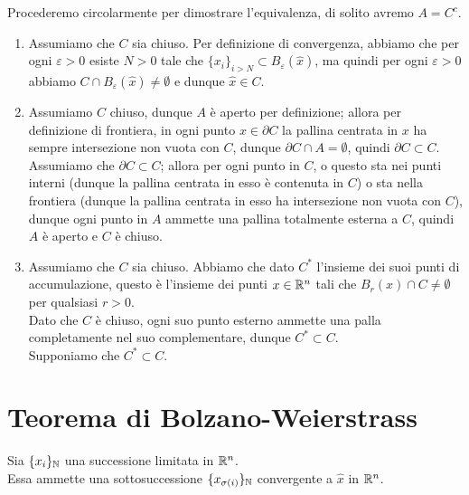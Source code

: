 \documentclass[openany]{book}
\begin{document}
    Procederemo circolarmente per dimostrare l'equivalenza, di solito avremo $A = C^c$.\begin{enumerate}
        \item Assumiamo che $C$ sia chiuso. Per definizione di convergenza, abbiamo che per ogni $\varepsilon > 0$ esiste $N>0$ tale che $\{x_i\}_{i>N} \subset B_\varepsilon(\hat{x})$, ma quindi per ogni $\varepsilon > 0$ abbiamo $C \cap B_\varepsilon(\hat{x})\neq \emptyset$ e dunque $\hat{x} \in C$.
        \item Assumiamo $C$ chiuso, dunque $A$ è aperto per definizione; allora per definizione di frontiera, in ogni punto $x\in\partial C$ la pallina centrata in $x$ ha sempre intersezione non vuota con $C$, dunque $\partial C \cap A = \emptyset$, quindi $\partial C \subset C$. Assumiamo che $\partial C\subset C$; allora per ogni punto in $C$, o questo sta nei punti interni (dunque la pallina centrata in esso è contenuta in $C$) o sta nella frontiera (dunque la pallina centrata in esso ha intersezione non vuota con $C$), dunque ogni punto in $A$ ammette una pallina totalmente esterna a $C$, quindi $A$ è aperto e $C$ è chiuso.
        \item Assumiamo che $C$ sia chiuso. Abbiamo che dato $C^*$ l'insieme dei suoi punti di accumulazione, questo è l'insieme dei punti $x\in\mathbb{R}^n$ tali che $B_r(x)\cap C \neq \emptyset$ per qualsiasi $r>0$.\\ Dato che $C$ è chiuso, ogni suo punto esterno ammette una palla completamente nel suo complementare, dunque $C^* \subset C$.\\
        Supponiamo che $C^* \subset C$. 
    \end{enumerate}


\section{Teorema di Bolzano-Weierstrass}

\begin{theorem}{}{}
    Sia $\{x_i\}_{\mathbb{N}}$ una successione limitata in $\mathbb{R}^n$.\\
    Essa ammette una sottosuccessione $\{x_{\sigma(i)}\}_{\mathbb{N}}$ convergente a $\hat{x}$ in $\mathbb{R}^n$.
\end{theorem}
\end{document}

